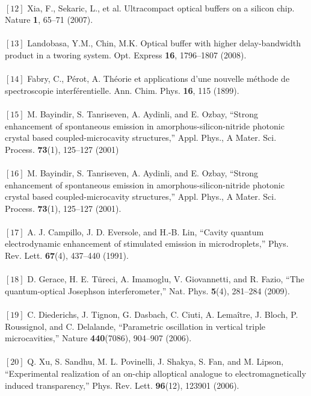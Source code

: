 {\\$[12]$ Xia, F., Sekaric, L., et al. Ultracompact optical buffers on a silicon chip. Nature \textbf{1}, 65–71
(2007).\\
\\$[13]$ Landobasa, Y.M., Chin, M.K. Optical buffer with higher delay-bandwidth product in a tworing system. Opt. Express \textbf{16}, 1796–1807 (2008).\\
\\$[14]$ Fabry, C., Pérot, A. Théorie et applications d’une nouvelle méthode de spectroscopie interférentielle. Ann. Chim. Phys. \textbf{16}, 115 (1899).\\
\\$[15]$ M. Bayindir, S. Tanriseven, A. Aydinli, and E. Ozbay, “Strong enhancement of spontaneous emission in
amorphous-silicon-nitride photonic crystal based coupled-microcavity structures,” Appl. Phys., A Mater. Sci.
Process. \textbf{73}(1), 125–127 (2001)\\
\\$[16]$ M. Bayindir, S. Tanriseven, A. Aydinli, and E. Ozbay, “Strong enhancement of spontaneous emission in
amorphous-silicon-nitride photonic crystal based coupled-microcavity structures,” Appl. Phys., A Mater. Sci.
Process. \textbf{73}(1), 125–127 (2001).\\
\\$[17]$ A. J. Campillo, J. D. Eversole, and H.-B. Lin, “Cavity quantum electrodynamic enhancement of stimulated
emission in microdroplets,” Phys. Rev. Lett. \textbf{67}(4), 437–440 (1991).\\
\\$[18]$ D. Gerace, H. E. Türeci, A. Imamoglu, V. Giovannetti, and R. Fazio, “The quantum-optical Josephson
interferometer,” Nat. Phys. \textbf{5}(4), 281–284 (2009).\\
\\$[19]$  C. Diederichs, J. Tignon, G. Dasbach, C. Ciuti, A. Lemaître, J. Bloch, P. Roussignol, and C. Delalande,
“Parametric oscillation in vertical triple microcavities,” Nature \textbf{440}(7086), 904–907 (2006).\\
\\$[20]$ Q. Xu, S. Sandhu, M. L. Povinelli, J. Shakya, S. Fan, and M. Lipson, “Experimental realization of an on-chip alloptical analogue to electromagnetically induced transparency,” Phys. Rev. Lett. \textbf{96}(12), 123901 (2006).}

